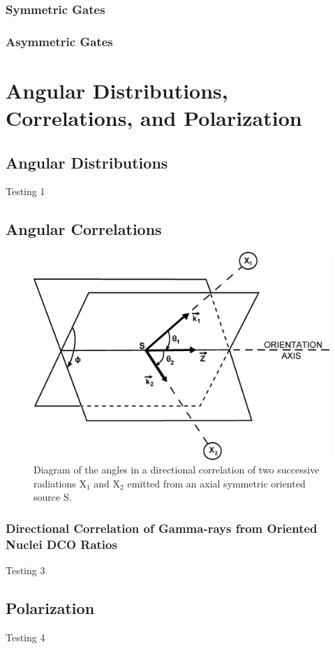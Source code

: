 \subsubsection{Symmetric Gates}
\label{sssec:exp-pr-data-proc-bg-sub-sym}
\subsubsection{Asymmetric Gates}
\label{sssec:exp-pr-data-proc-bg-sub-asym}

\section{Angular Distributions, Correlations, and Polarization}
\label{sec:exp-pr-data-ang}
\subsection{Angular Distributions}
\label{ssec:exp-pr-data-ang-dist}
Testing 1
\subsection{Angular Correlations}
\label{ssec:exp-pr-data-ang-cor}
\begin{figure}[h!]
	\centerline{\includegraphics[height=0.35\textheight]{./img/c3/dco_setup.eps}}
	\caption{Diagram of the angles in a directional correlation of two successive radiations X$_{1}$ and X$_{2}$ emitted from an axial symmetric oriented source S.}
	\label{fig:chp3-DCO-Angles}
\end{figure}
\subsubsection{Directional Correlation of Gamma-rays from Oriented Nuclei DCO Ratios}
\label{sssec:exp-pr-data-ang-cor-dco}
Testing 3
\subsection{Polarization}
\label{ssec:exp-pr-data-ang-pol}
Testing 4
